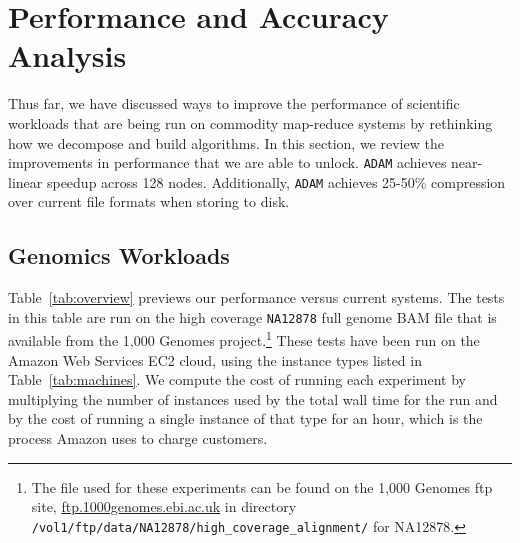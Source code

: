 \documentclass[masters]{ucbthesis}
\begin{document}
\chapter{Performance and Accuracy Analysis}

Thus far, we have discussed ways to improve the performance of scientific workloads that are
being run on commodity map-reduce systems by rethinking how we decompose and build algorithms.
In this section, we review the improvements in performance that we are able to unlock. \texttt{ADAM} achieves
near-linear speedup across 128 nodes. Additionally, \texttt{ADAM} achieves 25-50\% compression over current file formats when storing to disk.

\section{Genomics Workloads}
\label{sec:genomics-performance}

Table~\ref{tab:overview} previews our performance versus current systems. The tests in this table are run on the
high coverage \texttt{NA12878} full genome BAM file that is available from the 1,000 Genomes
project.\footnote{The file used for these experiments can be found on the
1,000 Genomes ftp site, \url{ftp.1000genomes.ebi.ac.uk} in directory 
\texttt{/vol1/ftp/data/NA12878/high\_coverage\_alignment/} for NA12878.} These tests have been run on the Amazon Web
Services EC2 cloud, using the instance types listed in
Table~\ref{tab:machines}. We compute the cost of running each experiment by multiplying the number of instances
used by the total wall time for the run and by the cost of running a single instance of that type for an hour, which is
the process Amazon uses to charge customers.
\end{document}
